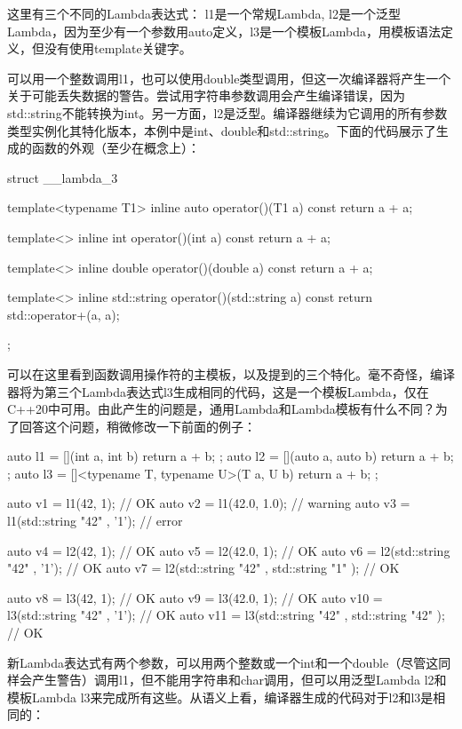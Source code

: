 这里有三个不同的Lambda表达式： l1是一个常规Lambda, l2是一个泛型Lambda，因为至少有一个参数用auto定义，l3是一个模板Lambda，用模板语法定义，但没有使用template关键字。

可以用一个整数调用l1，也可以使用double类型调用，但这一次编译器将产生一个关于可能丢失数据的警告。尝试用字符串参数调用会产生编译错误，因为std::string不能转换为int。另一方面，l2是泛型。编译器继续为它调用的所有参数类型实例化其特化版本，本例中是int、double和std::string。下面的代码展示了生成的函数的外观（至少在概念上）：

\begin{cpp}
struct __lambda_3
{
	template<typename T1>
	inline auto operator()(T1 a) const
	{
		return a + a;
	}

	template<>
	inline int operator()(int a) const
	{
		return a + a;
	}

	template<>
	inline double operator()(double a) const
	{
		return a + a;
	}

	template<>
	inline std::string operator()(std::string a) const
	{
		return std::operator+(a, a);
	}
};
\end{cpp}

可以在这里看到函数调用操作符的主模板，以及提到的三个特化。毫不奇怪，编译器将为第三个Lambda表达式l3生成相同的代码，这是一个模板Lambda，仅在C++20中可用。由此产生的问题是，通用Lambda和Lambda模板有什么不同？为了回答这个问题，稍微修改一下前面的例子：

\begin{cpp}
auto l1 = [](int a, int b) {return a + b; };
auto l2 = [](auto a, auto b) {return a + b; };
auto l3 = []<typename T, typename U>(T a, U b)
          { return a + b; };
          
auto v1 = l1(42, 1); // OK
auto v2 = l1(42.0, 1.0); // warning
auto v3 = l1(std::string{ "42" }, '1'); // error

auto v4 = l2(42, 1); // OK
auto v5 = l2(42.0, 1); // OK
auto v6 = l2(std::string{ "42" }, '1'); // OK
auto v7 = l2(std::string{ "42" }, std::string{ "1" }); // OK

auto v8 = l3(42, 1); // OK
auto v9 = l3(42.0, 1); // OK
auto v10 = l3(std::string{ "42" }, '1'); // OK
auto v11 = l3(std::string{ "42" }, std::string{ "42" }); // OK
\end{cpp}

新Lambda表达式有两个参数，可以用两个整数或一个int和一个double（尽管这同样会产生警告）调用l1，但不能用字符串和char调用，但可以用泛型Lambda l2和模板Lambda l3来完成所有这些。从语义上看，编译器生成的代码对于l2和l3是相同的：

